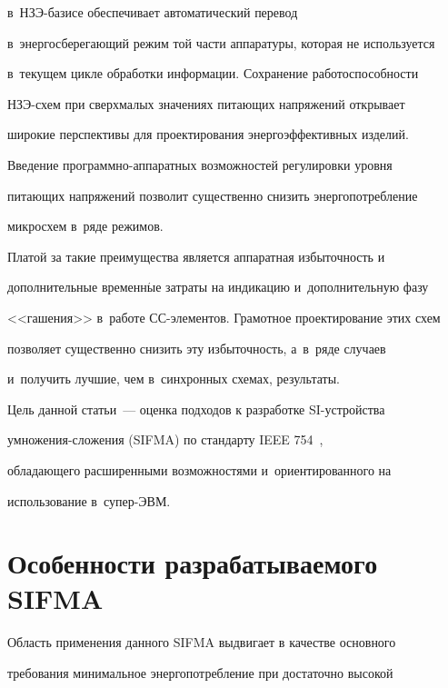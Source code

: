 в~НЗЭ-ба\-зи\-се обеспечивает автоматический перевод

в~энергосберегающий режим той части аппаратуры, которая не используется

в~текущем цикле обработки информации. Сохранение работоспособности

      НЗЭ-схем при сверхмалых значениях питающих напряжений открывает

широкие перспективы для проектирования энергоэффективных изделий.

Введение про\-грам\-мно-ап\-па\-рат\-ных возможностей регулировки уровня

питающих напряжений позволит существенно снизить энергопотребление

микросхем в~ряде режимов.



      Платой за такие преимущества является аппаратная избыточность и

дополнительные временн$\acute{\mbox{ы}}$е затраты на индикацию и~дополнительную фазу

<<гашения>> в~работе СС-эле\-мен\-тов. Грамотное проектирование этих схем

позволяет существенно снизить эту избыточность, а~в~ряде случаев~\cite{14-st1}

и~получить лучшие, чем в~синхронных схемах, результаты.



      Цель данной статьи~--- оценка подходов к разработке SI-устрой\-ст\-ва

умно\-же\-ния-сло\-же\-ния (SIFMA) по стандарту IEEE 754~\cite{6-st1},

обладающего расширенными возможностями и~ориентированного на

использование в~су\-пер-ЭВМ.






\section{Особенности разрабатываемого SIFMA}






      Область применения данного SIFMA выдвигает в качестве основного

требования минимальное энергопотребление при достаточно высокой

